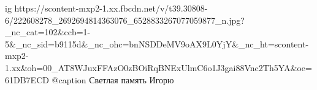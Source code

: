  
 
 
 
 

\ifcmt
  ig https://scontent-mxp2-1.xx.fbcdn.net/v/t39.30808-6/222608278_2692694814363076_6528833267077059877_n.jpg?_nc_cat=102&ccb=1-5&_nc_sid=b9115d&_nc_ohc=bnNSDDeMV9oAX9L0YjY&_nc_ht=scontent-mxp2-1.xx&oh=00_AT8WJuxFFAzO0zBOiRqBNExUlmC6o1J3gai88Vnc2Th5YA&oe=61DB7ECD
  @caption Светлая память Игорю
\fi
